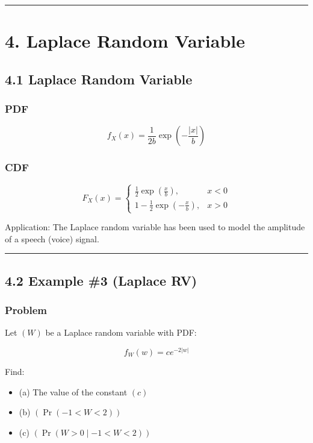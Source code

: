 \documentclass[12pt]{article}
\begin{document}
\hrule
\vspace{1em}

\section*{\textbf{4. Laplace Random Variable}}

\subsection*{\textbf{4.1 Laplace Random Variable}}

\subsubsection*{\textbf{PDF}}

\[
f_X(x)=\frac{1}{2b}\exp\left(-\frac{|x|}{b}\right)
\]

\subsubsection*{\textbf{CDF}}

\[
F_X(x)=
\begin{cases}
\frac{1}{2}\exp\left(\frac{x}{b}\right), & x<0 \\
1-\frac{1}{2}\exp\left(-\frac{x}{b}\right), & x>0
\end{cases}
\]

Application: The Laplace random variable has been used to model the amplitude of a speech (voice) signal.

\hrule
\vspace{1em}

\subsection*{\textbf{4.2 Example \#3 (Laplace RV)}}

\subsubsection*{\textbf{Problem}}

Let $(W)$ be a Laplace random variable with PDF:

\[
f_W(w)=ce^{-2|w|}
\]

Find:

\begin{itemize}
    \item (a) The value of the constant $(c)$
    \item (b) $(\Pr(-1<W<2))$
    \item (c) $(\Pr(W>0 \mid -1<W<2))$
\end{itemize}
\end{document}
